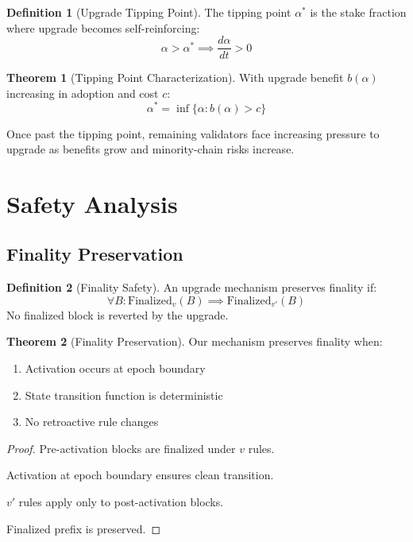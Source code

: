 \documentclass[11pt,a4paper]{article}
\theoremstyle{definition}
\newtheorem{definition}{Definition}[section]
\newtheorem{theorem}{Theorem}[section]
\theoremstyle{remark}
\begin{document}
\begin{definition}[Upgrade Tipping Point]
The tipping point $\alpha^*$ is the stake fraction where upgrade becomes self-reinforcing:
\begin{equation}
    \alpha > \alpha^* \implies \frac{d\alpha}{dt} > 0
\end{equation}
\end{definition}

\begin{theorem}[Tipping Point Characterization]
With upgrade benefit $b(\alpha)$ increasing in adoption and cost $c$:
\begin{equation}
    \alpha^* = \inf\{\alpha : b(\alpha) > c\}
\end{equation}
\end{theorem}

Once past the tipping point, remaining validators face increasing pressure to upgrade as benefits grow and minority-chain risks increase.

\section{Safety Analysis}

\subsection{Finality Preservation}

\begin{definition}[Finality Safety]
An upgrade mechanism preserves finality if:
\begin{equation}
    \forall B: \text{Finalized}_v(B) \implies \text{Finalized}_{v'}(B)
\end{equation}
No finalized block is reverted by the upgrade.
\end{definition}

\begin{theorem}[Finality Preservation]
Our mechanism preserves finality when:
\begin{enumerate}
    \item Activation occurs at epoch boundary
    \item State transition function is deterministic
    \item No retroactive rule changes
\end{enumerate}
\end{theorem}

\begin{proof}
Pre-activation blocks are finalized under $v$ rules.

Activation at epoch boundary ensures clean transition.

$v'$ rules apply only to post-activation blocks.

Finalized prefix is preserved.
\end{proof}
\end{document}
